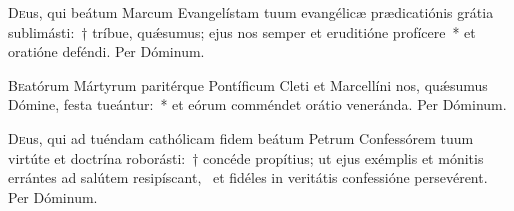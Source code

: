 \documentclass[vesperale_romanum.tex]{subfiles}
\begin{document}

\vespsequentiscomm

\myrule



\oratio

\lettrine{D}{e}us, qui beátum Marcum Evangelístam tuum evangélicæ prædicatiónis grátia sublimásti:~† tríbue, quǽsumus; ejus nos semper et eruditióne profícere~* et oratióne deféndi.
Per Dóminum.



\commsequentis

\myrule
\newpage


\semiduplex


\oratio

\lettrine{B}{e}atórum Mártyrum paritérque Pontíficum Cleti et Marcellíni nos, quǽsumus Dómine, festa tueántur:~* et eórum comméndet orátio veneránda. Per Dóminum.

\vespsequentiscomm

\myrule


\duplexmtv

\odoctoroptime

\oratio
\lettrine{D}{e}us, qui ad tuéndam cathólicam fidem beátum Petrum Confessórem tuum virtúte et doctrína roborásti:~† concéde propítius; ut ejus exémplis et mónitis errántes ad salútem resipíscant,~ et fidéles in veritátis confessióne persevérent.
Per Dóminum.


\myrule
\end{document}
